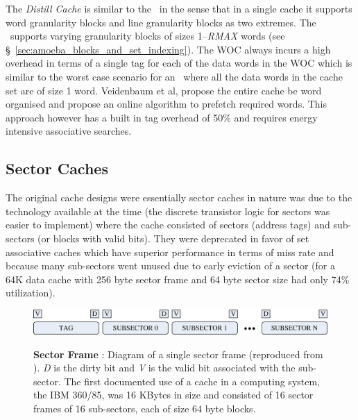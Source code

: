 The \textit{Distill Cache} is similar to the \AC\ in the sense that in a single cache it supports word granularity blocks and line granularity blocks as two extremes. The \AC\ supports varying granularity blocks of sizes 1--\textit{RMAX} words (see \S~\ref{sec:amoeba_blocks_and_set_indexing}). The WOC always incurs a high overhead in terms of a single tag for each of the data words in the WOC which is similar to the worst case scenario for an \AC\ where all the data words in the cache set are of size 1 word. Veidenbaum et al\cite{Veidenbaum:1999:ACL:305138.305188}, propose the entire cache be word organised and propose an online algorithm to prefetch required words. This approach however has a built in tag overhead of 50\% and requires energy intensive associative searches.

\subsection{Sector Caches}

The original cache designs\cite{liptay68} were essentially sector caches in nature was due to the technology available at the time (the discrete transistor logic for sectors was easier to implement) where the cache consisted of sectors (address tags) and sub-sectors (or blocks with valid bits). They were deprecated in favor of set associative caches which have superior performance in terms of miss rate and because many sub-sectors went unused due to early eviction of a sector (for a 64K data cache with 256 byte sector frame and 64 byte sector size had only 74\% utilization\cite{Rothman_Smith_2000}).
\\
\begin{figure}[h]
  \centering
  \includegraphics[width=\textwidth]{files/Figures/06-Sector.pdf}
  \\
  \caption[Sector Frame]{\textbf{Sector Frame} : Diagram of a single sector frame (reproduced from \cite{Rothman_Smith_2000}). \textit{D} is the dirty bit  and \textit{V} is the valid bit associated with the sub-sector. The first documented use of a cache in a computing system, the IBM 360/85, was 16 KBytes in size and consisted of 16 sector frames of 16 sub-sectors, each of size 64 byte blocks.}
  \label{fig:sector_frame}
\end{figure}

